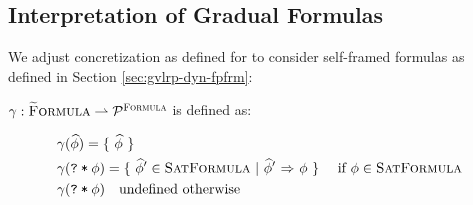 \documentclass {llncs}
\begin{document}
%
%

\subsection{Interpretation of Gradual Formulas}\label{sec:idf-interpret-grad-frm}

We adjust concretization as defined for \svl to consider self-framed formulas as defined in Section \ref{sec:gvlrp-dyn-fpfrm}:

\begin{definition}\label{def:idf-concretization}
    $\gamma : \textup{\textsc{\ensuremath{\widetilde{\text{F}}}ormula}} \rightharpoonup \mathcal{P}^{\textup{\textsc{Formula}}}$ is defined as:
    \begin{small}
    \begin{align*}
        & \gamma(\widehat{\phi}) = \{~ \widehat{\phi} ~\}                                                                           \\
        & \gamma({\textup{\texttt{?}}}\:\textup{\texttt{*}}\:{\phi}) = \{~ \widehat{\phi}' \in \textup{\textsc{SatFormula}} ~|~ {\widehat{\phi}'} \,\,{\Rightarrow}\,\, {\phi} ~\} \text{~~~~if $\phi \in \textup{\textsc{SatFormula}}$}\\
        & \gamma({\textup{\texttt{?}}}\:\textup{\texttt{*}}\:{\phi}) \quad \text{undefined otherwise}
    \end{align*}
    \end{small}
\end{definition}

\end{document}
